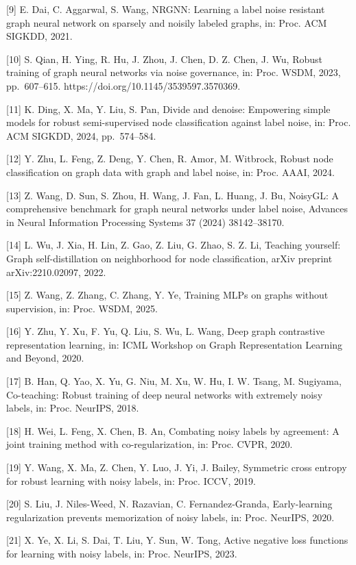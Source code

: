 {[}9{]} E. Dai, C. Aggarwal, S. Wang, NRGNN: Learning a label noise resistant graph neural network on sparsely and noisily labeled graphs, in: Proc. ACM SIGKDD, 2021.

{[}10{]} S. Qian, H. Ying, R. Hu, J. Zhou, J. Chen, D. Z. Chen, J. Wu, Robust training of graph neural networks via noise governance, in: Proc. WSDM, 2023, pp.~607--615. https://doi.org/10.1145/3539597.3570369.

{[}11{]} K. Ding, X. Ma, Y. Liu, S. Pan, Divide and denoise: Empowering simple models for robust semi-supervised node classification against label noise, in: Proc. ACM SIGKDD, 2024, pp.~574--584.

{[}12{]} Y. Zhu, L. Feng, Z. Deng, Y. Chen, R. Amor, M. Witbrock, Robust node classification on graph data with graph and label noise, in: Proc. AAAI, 2024.

{[}13{]} Z. Wang, D. Sun, S. Zhou, H. Wang, J. Fan, L. Huang, J. Bu, NoisyGL: A comprehensive benchmark for graph neural networks under label noise, Advances in Neural Information Processing Systems 37 (2024) 38142--38170.

{[}14{]} L. Wu, J. Xia, H. Lin, Z. Gao, Z. Liu, G. Zhao, S. Z. Li, Teaching yourself: Graph self-distillation on neighborhood for node classification, arXiv preprint arXiv:2210.02097, 2022.

{[}15{]} Z. Wang, Z. Zhang, C. Zhang, Y. Ye, Training MLPs on graphs without supervision, in: Proc. WSDM, 2025.

{[}16{]} Y. Zhu, Y. Xu, F. Yu, Q. Liu, S. Wu, L. Wang, Deep graph contrastive representation learning, in: ICML Workshop on Graph Representation Learning and Beyond, 2020.

{[}17{]} B. Han, Q. Yao, X. Yu, G. Niu, M. Xu, W. Hu, I. W. Tsang, M. Sugiyama, Co-teaching: Robust training of deep neural networks with extremely noisy labels, in: Proc. NeurIPS, 2018.

{[}18{]} H. Wei, L. Feng, X. Chen, B. An, Combating noisy labels by agreement: A joint training method with co-regularization, in: Proc. CVPR, 2020.

{[}19{]} Y. Wang, X. Ma, Z. Chen, Y. Luo, J. Yi, J. Bailey, Symmetric cross entropy for robust learning with noisy labels, in: Proc. ICCV, 2019.

{[}20{]} S. Liu, J. Niles-Weed, N. Razavian, C. Fernandez-Granda, Early-learning regularization prevents memorization of noisy labels, in: Proc. NeurIPS, 2020.

{[}21{]} X. Ye, X. Li, S. Dai, T. Liu, Y. Sun, W. Tong, Active negative loss functions for learning with noisy labels, in: Proc. NeurIPS, 2023.

